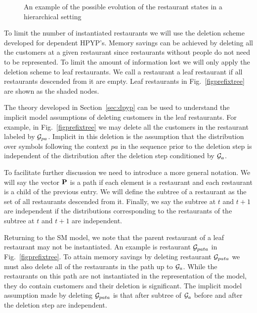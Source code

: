 \begin{figure}[t] 
	\begin{center}
		\caption{An example of the possible evolution of the restaurant states in a hierarchical setting}
		\label{figResultsCC}
	\end{center} 
\end{figure} 

To limit the number of instantiated restaurants we will use the deletion scheme developed for dependent HPYP's. Memory savings can be achieved by deleting all the customers at a given restaurant since restaurants without people do not need to be represented.  To limit the amount of information lost we will only apply the deletion scheme to leaf restaurants. We call a restaurant a leaf restaurant if all restaurants descended from it are empty. Leaf restaurants in Fig.~\ref{figprefixtree} are shown as the shaded nodes. 

The theory developed in Section~\ref{sec:dpyp} can be used to understand the implicit model assumptions of deleting customers in the leaf restaurants. For example, in Fig.~\ref{figprefixtree} we may delete all the customers in the restaurant labeled by $\G_{pa}$.  Implicit in this deletion is the assumption that the distribution over symbols following the context $pa$ in the sequence prior to the deletion step is independent of the distribution after the deletion step conditioned by $\G_a$.

To facilitate further discussion we need to introduce a more general notation.  We will say the vector $\bf{P}$ is a path if each element is a restaurant and each restaurant is a child of the previous entry.  We will define the subtree of a restaurant as the set of all restaurants descended from it.  Finally, we say the subtree at $t$ and $t+1$ are independent if the distributions corresponding to the restaurants of the subtree at $t$ and $t+1$ are independent.

Returning to the SM model, we note that the parent restaurant of a leaf restaurant may not be instantiated.  An example is restaurant $\G_{pata}$ in Fig.~\ref{figprefixtree}. To attain memory savings by deleting restaurant $\G_{pata}$ we must also delete all of the restaurants in the path up to $\G_a$.  While the restaurants on this path are not instantiated in the representation of the model, they do contain customers and their deletion is significant.  The implicit model assumption made by deleting $\G_{pata}$ is that after subtree of $\G_a$ before and after the deletion step are independent.

